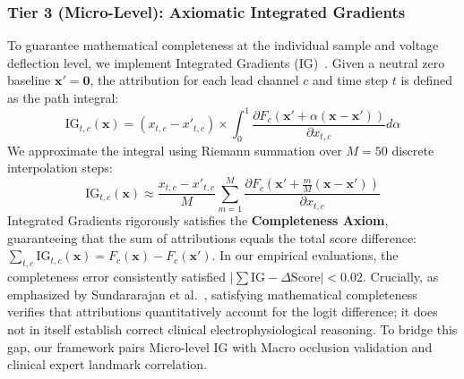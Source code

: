 \documentclass[12pt]{elsarticle}
\begin{document}
\subsubsection{Tier 3 (Micro-Level): Axiomatic Integrated Gradients}
To guarantee mathematical completeness at the individual sample and voltage deflection level, we implement Integrated Gradients (IG)~\cite{sundararajan2017axiomatic}. Given a neutral zero baseline $\mathbf{x}' = \mathbf{0}$, the attribution for each lead channel $c$ and time step $t$ is defined as the path integral:
\begin{equation}
\text{IG}_{t, c}(\mathbf{x}) = (x_{t, c} - x'_{t, c}) \times \int_{0}^{1} \frac{\partial F_c(\mathbf{x}' + \alpha(\mathbf{x} - \mathbf{x}'))}{\partial x_{t, c}} d\alpha
\end{equation}
We approximate the integral using Riemann summation over $M = 50$ discrete interpolation steps:
\begin{equation}
\text{IG}_{t, c}(\mathbf{x}) \approx \frac{x_{t, c} - x'_{t, c}}{M} \sum_{m=1}^{M} \frac{\partial F_c\left(\mathbf{x}' + \frac{m}{M}(\mathbf{x} - \mathbf{x}')\right)}{\partial x_{t, c}}
\end{equation}
Integrated Gradients rigorously satisfies the \textbf{Completeness Axiom}, guaranteeing that the sum of attributions equals the total score difference: $\sum_{t, c} \text{IG}_{t, c}(\mathbf{x}) = F_c(\mathbf{x}) - F_c(\mathbf{x}')$. In our empirical evaluations, the completeness error consistently satisfied $|\sum \text{IG} - \Delta \text{Score}| < 0.02$. Crucially, as emphasized by Sundararajan et al.~\cite{sundararajan2017axiomatic}, satisfying mathematical completeness verifies that attributions quantitatively account for the logit difference; it does not in itself establish correct clinical electrophysiological reasoning. To bridge this gap, our framework pairs Micro-level IG with Macro occlusion validation and clinical expert landmark correlation.
\end{document}
